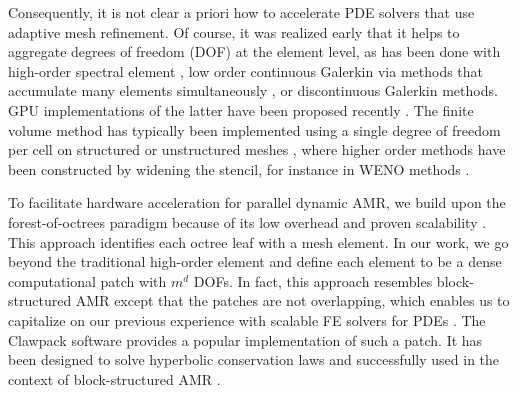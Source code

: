 \documentclass{IOS-Book-Article}     %
\newcommand{\comment}[1]{\textcolor{green}{[DAC: #1]}\xspace}
\newcommand{\todo}[1]{\textcolor{red}{[TODO: #1]}\xspace}
\newcommand{\clawpack}{{\sc Clawpack}\xspace}
\begin{document}
Consequently, it is not clear a priori how to accelerate PDE solvers
that use adaptive mesh refinement.
Of course, it was realized early that it helps to aggregate degrees of
freedom (DOF) at the element level, as has been done with high-order
spectral element \cite{TufoFischer99}, low order continuous Galerkin via methods that accumulate many elements simultaneously \cite{knepleyterrel:2013},
or discontinuous Galerkin \cite{HesthavenWarburton02}
methods.  GPU implementations of the latter have been proposed recently
\cite{KlocknerWarburtonBridgeEtAl09, BursteddeGhattasGurnisEtAl10}.
The finite volume method has typically been implemented using a single degree
of freedom per cell on
structured
\cite{ppm, clawpack}
or unstructured meshes
\cite{li:2010, he-hu:2008, do-om:2005, li-sh-sv-va:2007, openfoam},
where higher order methods have been constructed by widening the stencil, for instance in WENO methods
\cite{Shu:2009bi}.


To facilitate hardware acceleration for parallel dynamic AMR, we
build upon the forest-of-octrees paradigm because of its low overhead
and proven scalability \cite{BursteddeWilcoxGhattas11}.  This approach
identifies each octree leaf with a mesh element.  In our work, we go
beyond the traditional high-order element and define each element to
be a dense computational patch with $m^d$ DOFs.  In fact, this approach
resembles block-structured AMR \cite{be-ol:1984, be-co:1989,
ColellaGravesKeenEtAl07,
BerzinsLuitjensMengEtAl10} except that the
patches are not overlapping,
which enables us to capitalize on our
previous experience with scalable FE solvers for PDEs
\cite{BursteddeStadlerAlisicEtAl13}.  The \clawpack software
\cite{LeVeque97} provides a popular implementation of such a patch.
It has been designed to solve hyperbolic conservation laws
and successfully used in the context of block-structured AMR
\cite{be-le:1991, amrclaw, Berger:2011du}.
\end{document}
